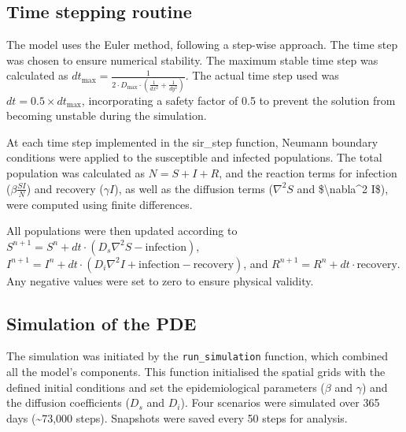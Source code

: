 \documentclass[
]{article}
\begin{document}
\subsection{Time stepping routine}\label{time-stepping-routine}

The model uses the Euler method, following a step-wise approach. The
time step was chosen to ensure numerical stability. The maximum stable
time step was calculated as
\(dt_{\text{max}} = \frac{1}{2 \cdot D_{\text{max}} \cdot (\frac{1}{dx^2} + \frac{1}{dy^2})}\).
The actual time step used was \(dt = 0.5 \times dt_{\text{max}}\),
incorporating a safety factor of 0.5 to prevent the solution from
becoming unstable during the simulation.

At each time step implemented in the sir\_step function, Neumann
boundary conditions were applied to the susceptible and infected
populations. The total population was calculated as \(N = S + I + R\),
and the reaction terms for infection (\(\beta \frac{SI}{N}\)) and
recovery (\(\gamma I\)), as well as the diffusion terms (\(\nabla^2 S\)
and \$\textbackslash nabla\^{}2 I\$), were computed using finite
differences.

All populations were then updated according to
\(S^{n+1} = S^n + dt \cdot (D_s \nabla^2 S - \text{infection})\),
\(I^{n+1} = I^n + dt \cdot (D_i \nabla^2 I + \text{infection} - \text{recovery})\),
and \(R^{n+1} = R^n + dt \cdot \text{recovery}\). Any negative values
were set to zero to ensure physical validity.

\subsection{Simulation of the PDE}\label{simulation-of-the-pde}

The simulation was initiated by the \texttt{run\_simulation} function,
which combined all the model's components. This function initialised the
spatial grids with the defined initial conditions and set the
epidemiological parameters (\(\beta\) and \(\gamma\)) and the diffusion
coefficients (\(D_s\) and \(D_i\)). Four scenarios were simulated over
365 days (\textasciitilde73,000 steps). Snapshots were saved every 50
steps for analysis.
\end{document}
